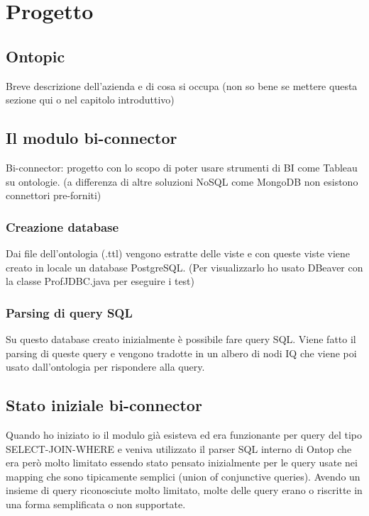 \chapter{Progetto}
\label{cha:experience}

\section{Ontopic}
\label{sec:ontopic}
Breve descrizione dell'azienda e di cosa si occupa (non so bene se mettere questa sezione qui o nel capitolo introduttivo)

\section{Il modulo bi-connector}
\label{sec:bi-connector}
Bi-connector: progetto con lo scopo di poter usare strumenti di BI come Tableau su ontologie. (a differenza di altre soluzioni NoSQL come MongoDB non esistono connettori pre-forniti)

\subsection{Creazione database}
\label{sec:bi-connector_db}
Dai file dell'ontologia (.ttl) vengono estratte delle viste e con queste viste viene creato in locale un database PostgreSQL. (Per visualizzarlo ho usato DBeaver con la classe ProfJDBC.java per eseguire i test)

\subsection{Parsing di query SQL}
\label{sec:bi-connector_parsing}
Su questo database creato inizialmente è possibile fare query SQL. 
Viene fatto il parsing di queste query e vengono tradotte in un albero di nodi IQ che viene poi usato dall'ontologia per rispondere alla query.

\section{Stato iniziale bi-connector}
\label{sec:experience_start}
Quando ho iniziato io il modulo già esisteva ed era funzionante per query del tipo SELECT-JOIN-WHERE e veniva utilizzato il parser SQL interno di Ontop che era però molto limitato essendo stato pensato inizialmente per le query usate nei mapping che sono tipicamente semplici (union of conjunctive queries).
Avendo un insieme di query riconosciute molto limitato, molte delle query erano o riscritte in una forma semplificata o non supportate.

